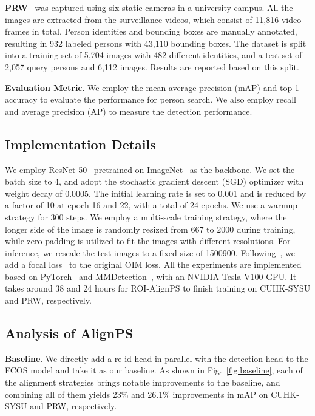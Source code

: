 \documentclass[journal]{IEEEtran}
\begin{document}
\textbf{PRW}~\cite{DBLP:conf/cvpr/ZhengZSCYT17} was captured using six static cameras in a university campus.
All the images are extracted from the surveillance videos, which consist of 11,816 video frames in total. Person identities and bounding boxes are manually annotated, resulting in 932 labeled persons with 43,110 bounding boxes. The dataset is split into a training set of 5,704 images with 482 different identities, and a test set of 2,057 query persons and 6,112 images. Results are reported based on this split.

\textbf{Evaluation Metric}. We employ the mean average precision (mAP) and top-1 accuracy to evaluate the performance for person search. We also employ recall and average precision (AP) to measure the detection performance.





\subsection{Implementation Details}
We employ ResNet-50~\cite{DBLP:conf/cvpr/HeZRS16} pretrained on ImageNet~\cite{DBLP:conf/cvpr/DengDSLL009} as the backbone. 
We set the batch size to 4, and adopt the stochastic gradient descent (SGD) optimizer with weight decay of 0.0005. The initial learning rate is set to 0.001 and is reduced by a factor of 10 at epoch 16 and 22, with a total of 24 epochs. We use a warmup strategy for 300 steps. We employ a multi-scale training strategy, where the longer side of the image is randomly resized from 667 to 2000 during training, while zero padding is utilized to fit the images with different resolutions. For inference, we rescale the test images to a fixed size of 1500900. Following~\cite{DBLP:conf/aaai/ChenZO0S20}, we add a focal loss~\cite{DBLP:conf/iccv/LinGGHD17} to the original OIM loss.
All the experiments are implemented based on PyTorch~\cite{DBLP:conf/nips/PaszkeGMLBCKLGA19} and MMDetection~\cite{DBLP:journals/corr/abs-1906-07155}, with an NVIDIA Tesla V100 GPU. It takes around 38 and 24 hours for ROI-AlignPS to finish training on CUHK-SYSU and PRW, respectively.

\subsection{Analysis of AlignPS}\label{sec:analytical}

\textbf{Baseline}.
We directly add a re-id head in parallel with the detection head to the FCOS model and take it as our baseline. As shown in Fig.~\ref{fig:baseline}, each of the alignment strategies brings notable improvements to the baseline, and combining all of them yields 23\% and 26.1\% improvements in mAP on CUHK-SYSU and PRW, respectively.
\end{document}
